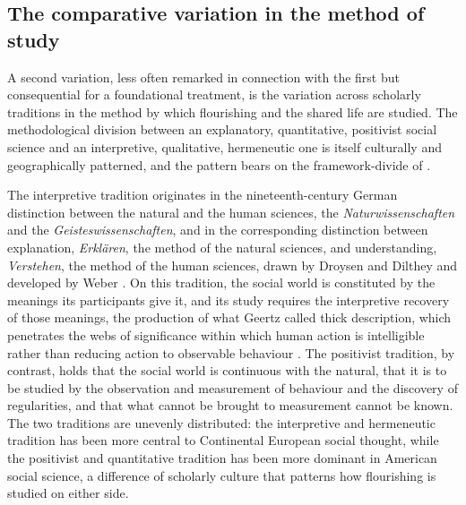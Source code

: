 \subsection{The comparative variation in the method of study}
\label{p11:sec:cc-method}

A second variation, less often remarked in connection with the first but consequential for a foundational treatment, is the variation across scholarly traditions in the method by which flourishing and the shared life are studied. The methodological division between an explanatory, quantitative, positivist social science and an interpretive, qualitative, hermeneutic one is itself culturally and geographically patterned, and the pattern bears on the framework-divide of .

The interpretive tradition originates in the nineteenth-century German distinction between the natural and the human sciences, the \emph{Naturwissenschaften} and the \emph{Geisteswissenschaften}, and in the corresponding distinction between explanation, \emph{Erklären}, the method of the natural sciences, and understanding, \emph{Verstehen}, the method of the human sciences, drawn by Droysen and Dilthey and developed by Weber \parencite{dilthey1883,weber1904}. On this tradition, the social world is constituted by the meanings its participants give it, and its study requires the interpretive recovery of those meanings, the production of what Geertz called thick description, which penetrates the webs of significance within which human action is intelligible rather than reducing action to observable behaviour \parencite{geertz1973}. The positivist tradition, by contrast, holds that the social world is continuous with the natural, that it is to be studied by the observation and measurement of behaviour and the discovery of regularities, and that what cannot be brought to measurement cannot be known. The two traditions are unevenly distributed: the interpretive and hermeneutic tradition has been more central to Continental European social thought, while the positivist and quantitative tradition has been more dominant in American social science, a difference of scholarly culture that patterns how flourishing is studied on either side.

